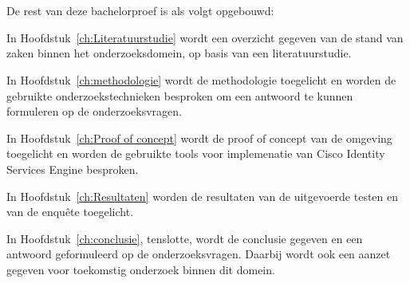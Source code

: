 \section{}
\label{sec:opzet-bachelorproef}


De rest van deze bachelorproef is als volgt opgebouwd:

In Hoofdstuk~\ref{ch:Literatuurstudie} wordt een overzicht gegeven van de stand van zaken binnen het onderzoeksdomein, op basis van een literatuurstudie.

In Hoofdstuk~\ref{ch:methodologie} wordt de methodologie toegelicht en worden de gebruikte onderzoekstechnieken besproken om een antwoord te kunnen formuleren op de onderzoeksvragen.

In Hoofdstuk~\ref{ch:Proof of concept} wordt de proof of concept van de omgeving toegelicht en worden de gebruikte tools voor implemenatie van Cisco Identity Services Engine besproken. 

In Hoofdstuk~\ref{ch:Resultaten} worden de resultaten van de uitgevoerde testen en van de enquête toegelicht.

In Hoofdstuk~\ref{ch:conclusie}, tenslotte, wordt de conclusie gegeven en een antwoord geformuleerd op de onderzoeksvragen. Daarbij wordt ook een aanzet gegeven voor toekomstig onderzoek binnen dit domein.